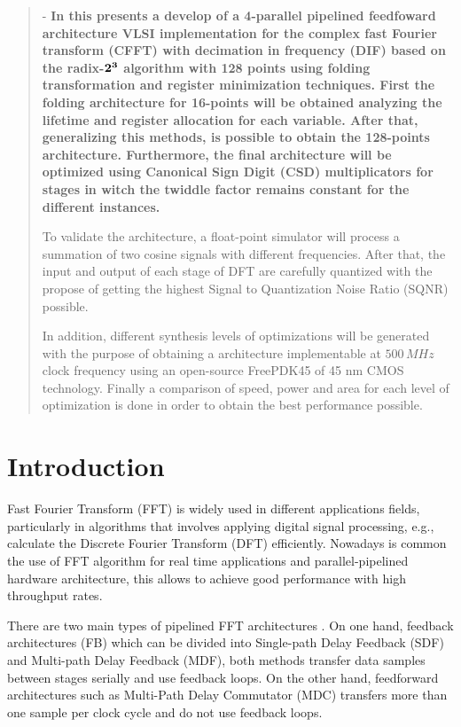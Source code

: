 \documentclass[journal,comsoc]{IEEEtran}
\begin{document}
\begin{abstract} - \bf In this presents a develop of a 4-parallel pipelined feedfoward architecture VLSI implementation for the complex fast Fourier transform (CFFT) with decimation in frequency (DIF) based on the radix-$\bf 2^3$ algorithm with 128 points using folding transformation and register minimization techniques. First the folding architecture for 16-points will be obtained analyzing the lifetime and register allocation for each variable. After that, generalizing this methods, is possible to obtain the 128-points architecture. Furthermore, the final architecture will be optimized using Canonical Sign Digit (CSD) multiplicators for stages in witch the twiddle factor remains constant for the different instances. 

To validate the architecture, a float-point simulator will process a summation of two cosine signals with different frequencies. After that, the input and output of each stage of DFT are carefully quantized with the propose of getting the highest Signal to Quantization Noise Ratio (SQNR) possible.

In addition, different synthesis levels of optimizations will be generated with the purpose of obtaining a architecture implementable at $500\,MHz$ clock frequency using an open-source FreePDK45 of 45 nm CMOS technology. Finally a comparison of speed, power and area for each level of optimization is done in order to obtain the best performance possible.

\end{abstract}

\section{Introduction}
 Fast Fourier Transform (FFT) is widely used in different applications fields, particularly in algorithms that involves applying digital signal processing, e.g., calculate the Discrete Fourier Transform (DFT) efficiently. Nowadays is common the use of FFT algorithm for real time applications and parallel-pipelined hardware architecture, this allows to achieve good performance with high throughput rates.

There are two main types of pipelined FFT architectures  \cite{shousheng_he_designing_1998}. On one hand, feedback architectures (FB) which can be divided into Single-path Delay Feedback (SDF) and Multi-path Delay Feedback (MDF), both methods transfer data samples between stages serially and use feedback loops. On the other hand, feedforward architectures such as Multi-Path Delay Commutator (MDC) transfers more than one sample per clock cycle and do not use feedback loops.
\end{document}
